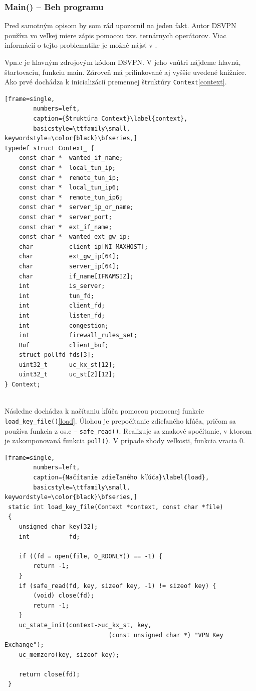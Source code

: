 \subsubsection{Main() -- Beh programu}
Pred samotným opisom by som rád upozornil na jeden fakt. Autor DSVPN používa vo veľkej miere zápis pomocou tzv. ternárnych operátorov. Viac informácií o tejto problematike je možné nájsť v \cite{ternary}.

Vpn.c je hlavným zdrojovým kódom DSVPN. V jeho vnútri nájdeme hlavnú, štartovaciu, funkciu main. Zároveň má prilinkované aj vyššie uvedené knižnice. Ako prvé dochádza k inicializácií premennej štruktúry \lstinline|Context|\ref{context}.

\begin{minipage}{\linewidth} 	
	\begin{lstlisting}[frame=single,
		numbers=left,
		caption={Štruktúra Context}\label{context},
		basicstyle=\ttfamily\small, keywordstyle=\color{black}\bfseries,]
typedef struct Context_ {
	const char *  wanted_if_name;
	const char *  local_tun_ip;
	const char *  remote_tun_ip;
	const char *  local_tun_ip6;
	const char *  remote_tun_ip6;
	const char *  server_ip_or_name;
	const char *  server_port;
	const char *  ext_if_name;
	const char *  wanted_ext_gw_ip;
	char          client_ip[NI_MAXHOST];
	char          ext_gw_ip[64];
	char          server_ip[64];
	char          if_name[IFNAMSIZ];
	int           is_server;
	int           tun_fd;
	int           client_fd;
	int           listen_fd;
	int           congestion;
	int           firewall_rules_set;
	Buf           client_buf;
	struct pollfd fds[3];
	uint32_t      uc_kx_st[12];
	uint32_t      uc_st[2][12];
} Context;   
 	\end{lstlisting}
\end{minipage}\\ 

 Následne dochádza k načítaniu kľúča pomocou pomocnej funkcie 
\\
 \lstinline|load_key_file()|\ref{load}. Úlohou je prepočítanie zdieľaného kľúča, pričom sa používa funkcia z os.c -- \lstinline|safe_read()|. Realizuje sa znakové spočítanie, v ktorom je zakomponovaná funkcia  \lstinline|poll()|\cite{poll}. V prípade zhody veľkosti, funkcia vracia 0.
 
 \begin{minipage}{\linewidth} 	
 	\begin{lstlisting}[frame=single,
 		numbers=left,
 		caption={Načítanie zdieľaného kľúča}\label{load},
 		basicstyle=\ttfamily\small, keywordstyle=\color{black}\bfseries,]
 static int load_key_file(Context *context, const char *file)
 {
 	unsigned char key[32];
 	int           fd;
 	
 	if ((fd = open(file, O_RDONLY)) == -1) {
 		return -1;
 	}
 	if (safe_read(fd, key, sizeof key, -1) != sizeof key) {
 		(void) close(fd);
 		return -1;
 	}
 	uc_state_init(context->uc_kx_st, key, 
 							 (const unsigned char *) "VPN Key Exchange");
 	uc_memzero(key, sizeof key);
 	
 	return close(fd);
 }
  	\end{lstlisting}
\end{minipage}\\ 

